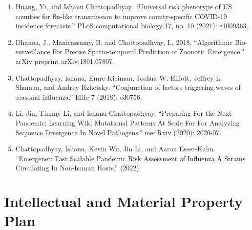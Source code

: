 \documentclass[onecolumn, compsoc,12pt]{IEEEtran}
\begin{document}
\begin{enumerate} 
[label=$\square$, leftmargin=0pt,
labelindent=0em, topsep=0.1em, labelsep=*, itemsep=.5em,itemindent=1em]
\item Huang, Yi, and Ishanu Chattopadhyay. ``Universal risk phenotype of US counties for flu-like transmission to improve county-specific COVID-19 incidence forecasts.'' PLoS computational biology 17, no. 10 (2021): e1009363.

\item Dhanoa, J., Manicassamy, B. and Chattopadhyay, I., 2018. ``Algorithmic Bio-surveillance For Precise Spatio-temporal Prediction of Zoonotic Emergence.'' arXiv preprint arXiv:1801.07807.

\item Chattopadhyay, Ishanu, Emre Kiciman, Joshua W. Elliott, Jeffrey L. Shaman, and Andrey Rzhetsky. ``Conjunction of factors triggering waves of seasonal influenza.'' Elife 7 (2018): e30756.

\item Li, Jin, Timmy Li, and Ishanu Chattopadhyay. ``Preparing For the Next Pandemic: Learning Wild Mutational Patterns At Scale For For Analyzing Sequence Divergence In Novel Pathogens.'' medRxiv (2020): 2020-07.

  \item Chattopadhyay, Ishanu, Kevin Wu, Jin Li, and Aaron Esser-Kahn. ``Emergenet: Fast Scalable Pandemic Risk Assessment of Influenza A Strains Circulating In Non-human Hosts.'' (2022).

\end{enumerate}

\clearpage



\clearpage




\clearpage
\setcounter{subsection}{0}
\section*{Intellectual and Material Property Plan}
\end{document}
